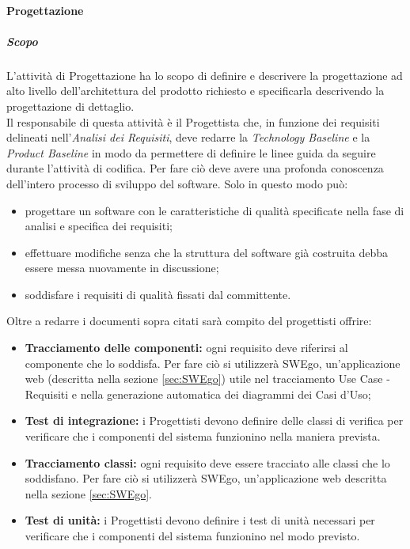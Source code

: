 		\paragraph{Progettazione}
			\subparagraph{Scopo}
			\Spazio
			L'attività di Progettazione ha lo scopo di definire e descrivere la progettazione ad alto livello dell'architettura del prodotto richiesto e specificarla descrivendo la progettazione di dettaglio. \\
			Il responsabile di questa attività è il Progettista che, in funzione dei requisiti delineati nell'\textit{Analisi dei Requisiti}, deve redarre la \textit{Technology Baseline} e la \textit{Product Baseline} in modo da permettere di definire le linee guida da seguire durante l'attività di codifica.
			Per fare ciò deve avere una profonda conoscenza dell'intero processo di sviluppo del software.
			Solo in questo modo può:
			\begin{itemize}
				\item progettare un software con le caratteristiche di qualità specificate nella fase di analisi e specifica dei requisiti;
				\item effettuare modifiche senza che la struttura del software già costruita debba essere messa nuovamente in discussione;
				\item soddisfare i requisiti di qualità fissati dal committente.
			\end{itemize}
			Oltre a redarre i documenti sopra citati sarà compito del progettisti offrire:
			\begin{itemize}
				\item \textbf{Tracciamento delle componenti:}
				ogni requisito deve riferirsi al componente che lo soddisfa. Per fare ciò si utilizzerà SWEgo, un'applicazione web (descritta nella sezione \ref{sec:SWEgo}) utile nel tracciamento Use Case - Requisiti e nella generazione automatica dei diagrammi dei Casi d'Uso;
				\item \textbf{Test di integrazione:}
				i Progettisti devono definire delle classi di verifica per verificare che i componenti del sistema funzionino nella maniera prevista.	
				\item \textbf{Tracciamento classi:}
				ogni requisito deve essere tracciato alle classi che lo soddisfano. Per fare ciò si utilizzerà SWEgo, un'applicazione web descritta nella sezione \ref{sec:SWEgo}.
				\item \textbf{Test di unità:}
				i Progettisti devono definire i test di unità necessari per verificare che i componenti del sistema funzionino nel modo previsto.
			\end{itemize}
		
